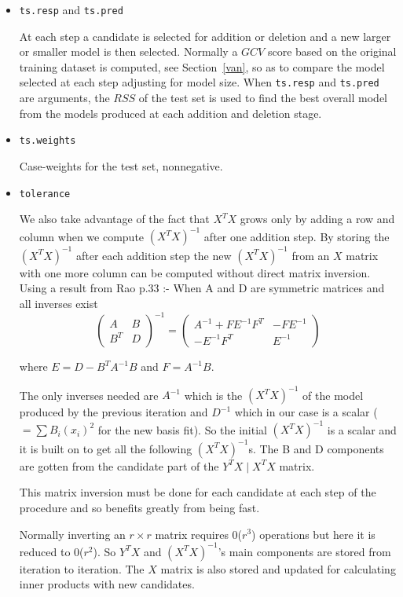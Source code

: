 \begin{itemize}
\item {\tt ts.resp} and {\tt ts.pred}

At each step a candidate is selected for addition or deletion and
a new larger or smaller model is then selected. Normally a $GCV$ score
based on the original training dataset is computed, see
Section~\ref{van}, so as to compare the model
selected at each step adjusting for model size.
When {\tt ts.resp} and {\tt ts.pred} are
arguments, the $RSS$ of the test set is used to find the best overall
model from the models produced at each addition and deletion stage.

\item {\tt ts.weights}

Case-weights for the test set, nonnegative.

\item {\tt tolerance}

We also take advantage of the fact that $X^TX$ grows only by adding a row
and column when we compute $(X^TX)^{-1}$ after one addition step.
By storing the $(X^TX)^{-1}$ after each addition step the
new $(X^TX)^{-1}$ from an $X$ matrix with one more column can be
computed without direct matrix inversion. Using a result
from Rao\cite{B} p.33 :- When A and D are symmetric matrices
and all inverses exist
$$ \left( \begin{array}{ll}
	A & B\\
	B^T & D
	\end{array} \right)^{-1}  = 
	\left( \begin{array}{ll}
	A^{-1}+FE^{-1}F^T & -FE^{-1}\\
	 - E^{-1}F^T & E^{-1}
 	\end{array} \right) $$

where $E = D - B^TA^{-1}B$ and $F = 
A^{-1}B$. 


The only inverses needed are $A^{-1}$ which is the
$(X^TX)^{-1}$ of the model produced by the previous iteration and $D^{-1}$ which in our case is a
scalar ($ = \sum B_i(x_i)^2$ for the new basis fit). So the initial $(X^TX)^{-1}$ is a scalar and it is built on to get
all the following $(X^TX)^{-1}$s. The B and D components
are gotten from the candidate part of the $Y^TX\mid X^TX$ matrix. 

This
matrix inversion must be done 
for each candidate at each step of the procedure and so benefits
greatly from being fast.

Normally inverting an $r \times r$ matrix requires 0($r^3$) operations
but here it is 
reduced to 0($r^2$). 
So $Y^TX$ and $(X^TX)^{-1}$'s main components are stored from iteration
to iteration. The $X$ matrix is also stored and updated for
calculating inner products with new candidates. 


\end{itemize}
